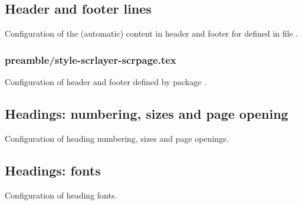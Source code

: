 
\subsection{Header and footer lines}
\label{sec:style:headfoot}

Configuration of the (automatic) content in header and footer for  defined in file .


\subsubsection{preamble/style-scrlayer-scrpage.tex}

Configuration of header and footer defined by package . 


\subsection{Headings: numbering, sizes and page opening}
\label{sec:style:headings}

Configuration of heading numbering, sizes and page openings.


\subsection{Headings: fonts}
\label{sec:style:headings:fonts}

Configuration of heading fonts.


